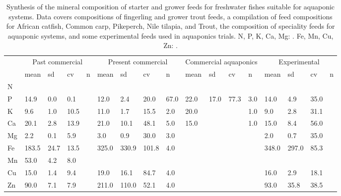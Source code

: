 \begin{sidewaystable}
\centering
  \begin{threeparttable}
  
  \caption{Synthesis of the mineral composition of starter and grower feeds for freshwater fishes suitable for aquaponic systems. Data covers compositions of fingerling and grower trout feeds, a compilation of feed compositions for African catfish, Common carp, Pikeperch, Nile tilapia, and Trout, the composition of speciality feeds for aquaponic systems, and some experimental feeds used in aquaponics trials. N, P, K, Ca, Mg: \si{\gkg}. Fe, Mn, Cu, Zn: \si{\mgkg}.}
  \label{tab:feedcomp}
  
    \begin{tabularx}{\textwidth}{XXXXXXXXXXXXXXXXX}

\toprule

& \multicolumn{4}{c}{Past commercial} %
& \multicolumn{4}{c}{Present commercial} %
& \multicolumn{4}{c}{Commercial aquaponics} %
& \multicolumn{4}{c}{Experimental} %
\\
  \cline{2-5}\cline{6-9}\cline{10-13}\cline{14-17}
  
& mean
& sd  
& cv  
& n 
& mean  
& sd  
& cv  
& n 
& mean  
& sd  
& cv  
& n 
& mean  
& sd  
& cv  
& n 
\\

\midrule

N
& \tnote{‡}
&
&
&
&
&
&
&
&
&
&
&
&
&
&
&
\\ %
P
& 14.9
& 0.0
& 0.1
&
& 12.0
& 2.4
& 20.0
& 67.0
& 22.0
& 17.0
& 77.3
& 3.0
& 14.0
& 4.9
& 35.0
&
\\ %
K
& 9.6 
& 1.0
& 10.5
& 
& 11.0
& 1.7
& 15.5
& 2.0
& 20.0
& &
& 1.0
& 9.0
& 2.8
& 31.1
&
\\ %
Ca
& 20.1
& 2.8
& 13.9
& 
& 21.0
& 10.1
& 48.1
& 5.0
& 15.0
&
&
& 1.0
& 15.0
& 8.4
& 56.0
&
\\ %
Mg\tnote{*}
& 2.2
& 0.1
& 5.9
&
& 3.0
& 0.9
& 30.0
& 3.0
&
&
&
&
& 2.0
& 0.7
& 35.0
&
\\ %
Fe\tnote{*}
& 183.5
& 24.7
& 13.5
&
& 325.0
& 330.9
& 101.8
& 4.0
&
&
&
&
& 348.0
& 297.0
& 85.3
&
\\ %
Mn\tnote{*}
& 53.0
& 4.2 
& 8.0
&
&
&
&
&
&
&
&
&
&
&
&
&
\\ %
Cu\tnote{*}
& 15.0
& 1.4
& 9.4
&
& 19.0
& 16.1
& 84.7
& 4.0
&
&
&
&
& 16.0
& 2.9
& 18.1
&
\\ %
Zn\tnote{*}
& 90.0
& 7.1
& 7.9
&
& 211.0
& 110.0
& 52.1
& 4.0
& 
&
&
&
& 93.0
& 35.8
& 38.5
&
\\ %


\end{tabularx}
\end{threeparttable}
\end{sidewaystable}

